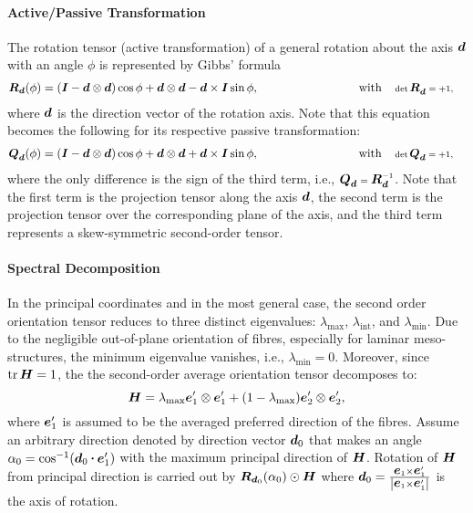 	\paragraph{Active/Passive Transformation} The rotation tensor (active transformation) of a general rotation about the axis $\tena{d}$ with an angle $\phi$ is represented by Gibbs' formula~\autocite{Eremeyev.2013}
	\begin{alignat}{3}
		&\tenb{R}_{\scriptsize\tena{d}}(\phi)=(\unitb-\tena{d}\dyad\tena{d})\cos\phi+\tena{d}\dyad\tena{d}-\tena{d}\times\unitb\sin\phi,&\hspace*{2cm}\qquad\text{with}\quad &\det{\tenb{R}_{\scriptsize\tena{d}}}=+1,
	\end{alignat}
	where $\tena{d}$ is the direction vector of the rotation axis. Note that this equation becomes the following for its respective passive transformation:
	\begin{alignat}{3}\label{eq:arb_trans}
		&\tenb{Q}_{\scriptsize\tena{d}}(\phi)=(\unitb-\tena{d}\dyad\tena{d})\cos\phi+\tena{d}\dyad\tena{d}+\tena{d}\times\unitb\sin\phi,&\hspace*{2cm}\qquad\text{with}\quad &\det{\tenb{Q}_{\scriptsize\tena{d}}}=+1,
	\end{alignat}
	where the only difference is the sign of the third term, i.e., $\tenb{Q}_{\scriptsize\tena{d}}=\tenb{R}_{\scriptsize\tena{d}}^\inv$. Note that the first term is the projection tensor along the axis $\tena{d}$, the second term is the projection tensor over the corresponding plane of the axis, and the third term represents a skew-symmetric second-order tensor.
	
	\paragraph{Spectral Decomposition} 	In the principal coordinates and in the most general case, the second order orientation tensor reduces to three distinct eigenvalues: $\lambda_\text{max}$, $\lambda_\text{int}$, and $\lambda_\text{min}$. Due to the negligible out-of-plane orientation of fibres, especially for laminar meso-structures, the minimum eigenvalue vanishes, i.e., $\lambda_\text{min}=0$. Moreover, since $\tr{\tenb{H}}=1$, the the second-order average orientation tensor decomposes to:
	\begin{equation}
		\tenb{H}=\lambda_\text{max}\base^\prime_1\dyad\base^\prime_1+(1-\lambda_\text{max})\base^\prime_2\dyad\base^\prime_2,
	\end{equation}
	where $\base^\prime_1$ is assumed to be the averaged preferred direction of the fibres. Assume an arbitrary direction denoted by direction vector $\tena{d}_0$ that makes an angle $\alpha_0=\cos^{-1}(\tena{d}_0\scp\base^\prime_1)$ with the maximum principal direction of $\tenb{H}$. Rotation of $\tenb{H}$ from principal direction is carried out by $\tenb{R}_{\scriptsize\tena{d}_0}(\alpha_0)\Rayleigh\tenb{H}$ where $\tena{d}_0=\frac{\base_1\cross\base^\prime_1}{\norm{\base_1\cross\base^\prime_1}}$ is the axis of rotation.	
	

